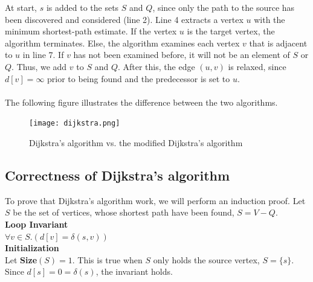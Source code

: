 \documentclass[11pt]{article}
\begin{document}
\noindent At start, $s$ is added to the sets $S$ and $Q$, since only the path to the source has been discovered and considered (line 2). Line 4 extracts a vertex $u$ with the minimum shortest-path estimate. If the vertex $u$ is the target vertex, the algorithm terminates. Else, the algorithm examines each vertex $v$ that is adjacent to $u$ in line 7. If $v$ has not been examined before, it will not be an element of $S$ or $Q$. Thus, we add $v$ to $S$ and $Q$. After this, the edge $(u,v)$ is relaxed, since $d[v]=\infty$ prior to being found and the predecessor is set to $u$.\\\\
The following figure illustrates the difference between the two algorithms.\\
\begin{figure}[H]
\centering
\texttt{[image: dijkstra.png]}
\caption{Dijkstra's algorithm vs. the modified Dijkstra's algorithm}
\end{figure}


\subsection{Correctness of Dijkstra's algorithm}
To prove that Dijkstra's algorithm work, we will perform an induction proof. Let $S$ be the set of vertices, whose shortest path have been found, $S=V-Q$.\\

\noindent \textbf{Loop Invariant}\\
$\forall v\in S.(d[v] = \delta(s,v))$\\

\noindent \textbf{Initialization}\\
Let \textbf{Size}$(S)=1$. This is true when $S$ only holds the source vertex, $S = \{s\}$. Since $d[s]=0=\delta(s)$, the invariant holds.\\
\end{document}

